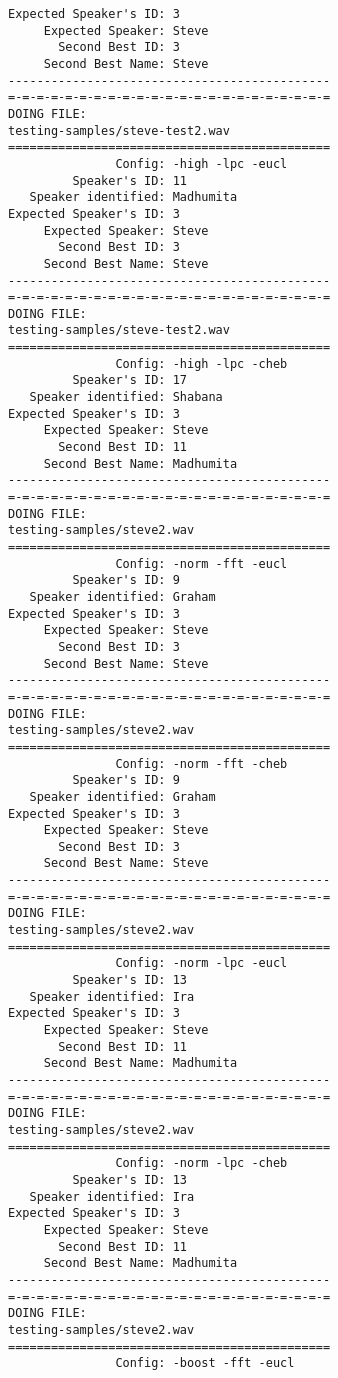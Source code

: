 \begin{verbatim}
Expected Speaker's ID: 3
     Expected Speaker: Steve
       Second Best ID: 3
     Second Best Name: Steve
---------------------------------------------
=-=-=-=-=-=-=-=-=-=-=-=-=-=-=-=-=-=-=-=-=-=-=
DOING FILE:
testing-samples/steve-test2.wav
=============================================
               Config: -high -lpc -eucl
         Speaker's ID: 11
   Speaker identified: Madhumita
Expected Speaker's ID: 3
     Expected Speaker: Steve
       Second Best ID: 3
     Second Best Name: Steve
---------------------------------------------
=-=-=-=-=-=-=-=-=-=-=-=-=-=-=-=-=-=-=-=-=-=-=
DOING FILE:
testing-samples/steve-test2.wav
=============================================
               Config: -high -lpc -cheb
         Speaker's ID: 17
   Speaker identified: Shabana
Expected Speaker's ID: 3
     Expected Speaker: Steve
       Second Best ID: 11
     Second Best Name: Madhumita
---------------------------------------------
=-=-=-=-=-=-=-=-=-=-=-=-=-=-=-=-=-=-=-=-=-=-=
DOING FILE:
testing-samples/steve2.wav
=============================================
               Config: -norm -fft -eucl
         Speaker's ID: 9
   Speaker identified: Graham
Expected Speaker's ID: 3
     Expected Speaker: Steve
       Second Best ID: 3
     Second Best Name: Steve
---------------------------------------------
=-=-=-=-=-=-=-=-=-=-=-=-=-=-=-=-=-=-=-=-=-=-=
DOING FILE:
testing-samples/steve2.wav
=============================================
               Config: -norm -fft -cheb
         Speaker's ID: 9
   Speaker identified: Graham
Expected Speaker's ID: 3
     Expected Speaker: Steve
       Second Best ID: 3
     Second Best Name: Steve
---------------------------------------------
=-=-=-=-=-=-=-=-=-=-=-=-=-=-=-=-=-=-=-=-=-=-=
DOING FILE:
testing-samples/steve2.wav
=============================================
               Config: -norm -lpc -eucl
         Speaker's ID: 13
   Speaker identified: Ira
Expected Speaker's ID: 3
     Expected Speaker: Steve
       Second Best ID: 11
     Second Best Name: Madhumita
---------------------------------------------
=-=-=-=-=-=-=-=-=-=-=-=-=-=-=-=-=-=-=-=-=-=-=
DOING FILE:
testing-samples/steve2.wav
=============================================
               Config: -norm -lpc -cheb
         Speaker's ID: 13
   Speaker identified: Ira
Expected Speaker's ID: 3
     Expected Speaker: Steve
       Second Best ID: 11
     Second Best Name: Madhumita
---------------------------------------------
=-=-=-=-=-=-=-=-=-=-=-=-=-=-=-=-=-=-=-=-=-=-=
DOING FILE:
testing-samples/steve2.wav
=============================================
               Config: -boost -fft -eucl

\end{verbatim}
